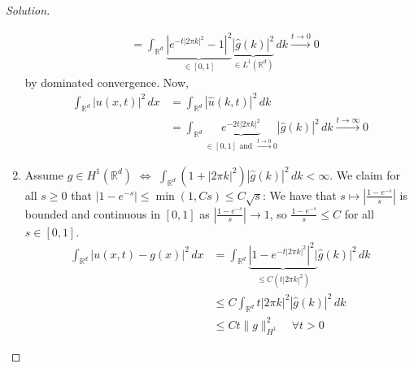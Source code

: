 \documentclass{report}
\theoremstyle{tommy}
\begin{document}
\begin{proof}[Solution]
\begin{enumerate}[label=\alph*)]
\begin{align*}
      &= \int_{\mathbb{R}^d} \underbrace{|e^{-t |2 \pi k|^2}- 1|^2}_{\in [0,1]}\underbrace{|\hat g(k)|^2}_{\in L^1(\mathbb{R}^d)} \, dk \xrightarrow{t \to 0} 0
    \end{align*}
    by dominated convergence. Now,
    \begin{align*}
      \int_{\mathbb{R}^d} |u(x,t)|^2 \, dx &= \int_{\mathbb{R}^d} |\hat u(k,t)|^2 \, dk \\
      &= \int_{\mathbb{R}^d} \underbrace{e^{-2t|2 \pi k|^2}}_{\in [0,1] \text{ and } \xrightarrow{t \to 0} 0} |\hat g (k)|^2 \, dk \xrightarrow{t \to \infty} 0
    \end{align*}
    \item Assume \(g \in H^1(\mathbb{R}^d)\) \(\Leftrightarrow\) \(\int_{\mathbb{R}^d} (1 + |2 \pi k|^2)|\hat g(k)|^2 \, dk < \infty\). We claim for all \(s \ge 0\) that \(\left|1 - e^{-s}\right| \le \min(1,Cs) \le C \sqrt{s}\): We have that \(s \mapsto \left|\frac{1-e^{-s}}{s}\right|\) is bounded and continuous in \([0,1]\) as \(\left|\frac{1 - e^{-s}}{s}\right| \to 1\), so \(\frac{1-e^{-s}}{s}\le C\) for all \(s \in [0,1]\).
    \begin{align*}
      \int_{\mathbb{R}^d} |u(x,t) - g(x)|^2 \, dx 
      &= \int_{\mathbb{R}^d} \underbrace{\left|1 - e^{-t |2 \pi k|^2}\right|^2|}_{\le C(t |2 \pi k|^2)}\hat g(k)|^2 \, dk \\
      &\le C \int_{\mathbb{R}^d} t |2 \pi k|^2 |\hat g(k)|^2 \, dk \\
      &\le Ct \|g\|_{H^1}^2 \quad \forall t > 0
    \end{align*}
  \end{enumerate}
\end{proof}
\end{document}
